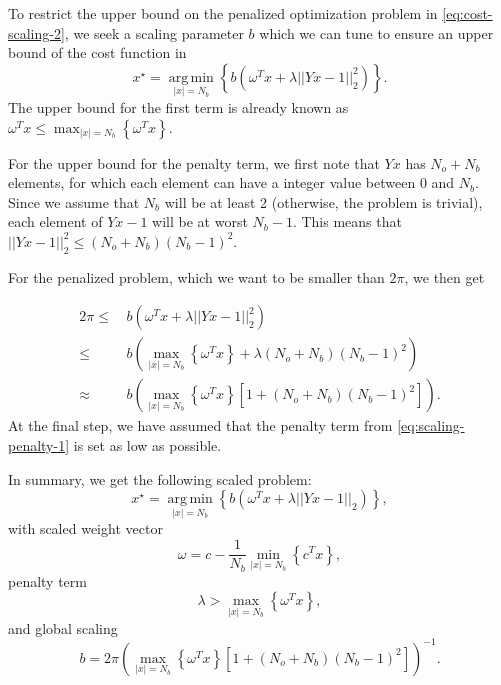 \documentclass{article}
\newcommand{\argmin}{\operatorname*{arg\,min}}
\begin{document}
To restrict the upper bound on the penalized optimization problem in \eqref{eq:cost-scaling-2}, we seek a scaling parameter $b$ which we can tune to ensure an upper bound of the cost function in
\begin{equation}
    x^{\star} = \argmin_{ |x| = N_b} \left\{ b \left( \omega^T x  + \lambda ||Y x - 1||^2_2 \right)\right\}.
    \label{eq:cost-scaling-3}
\end{equation}
The upper bound for the first term is already known as $\omega^T x \leq \max_{|x| = N_b}\left\{ \omega^T x \right\}$.

For the upper bound for the penalty term, we first note that $Y x$ has $N_o + N_b$ elements, for which each element can have a integer value between 0 and $N_b$. Since we assume that $N_b$ will be at least 2 (otherwise, the problem is trivial), each element of $Y x - 1$ will be at worst $N_b - 1$.
This means that $||Y x - 1||^2_2 \leq (N_o + N_b)(N_b - 1)^2$.

For the penalized problem, which we want to be smaller than $2 \pi$, we then get

\begin{equation}
    \begin{split}
     2\pi \leq&\, b\left(\omega^T x + \lambda ||Y x - 1||^2_2 \right) \\
        \leq&\, b\left(\max_{|x| = N_b}\left\{ \omega^T x \right\} + \lambda (N_o + N_b)(N_b - 1)^2 \right)\\
        \approx&\, b\left(\max_{|x| = N_b}\left\{ \omega^T x \right\} \left[ 1 + (N_o + N_b)(N_b - 1)^2 \right]\right).
    \end{split}
\end{equation}
At the final step, we have assumed that the penalty term from \eqref{eq:scaling-penalty-1} is set as low as possible.

In summary, we get the following scaled problem:
\begin{equation}
    x^{\star} = \argmin_{ |x| = N_b} \left\{ b \left( \omega^T x  + \lambda ||Y x - 1||_2 \right)\right\},
    \label{eq:scaled-ec}
\end{equation}
with scaled weight vector
\begin{equation}
    \omega = c - \frac{1}{N_b} \min_{|x| = N_b}\left\{ c^T x \right\}, 
    \label{eq:scaled-cost-vector}
\end{equation}
penalty term
\begin{equation}
    \lambda > \max_{|x| = N_b}\left\{ \omega^T x \right\},
    \label{eq:scaled-penalty}
\end{equation}
and global scaling
\begin{equation}
    b = 2 \pi \left(\max_{|x| = N_b}\left\{ \omega^T x \right\} \left[ 1 + (N_o + N_b)(N_b - 1)^2 \right]\right)^{-1}.
    \label{eq:scaled-scale}
\end{equation}
\end{document}
